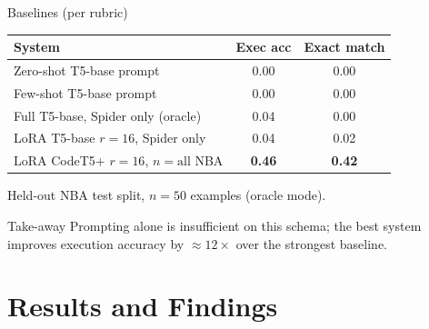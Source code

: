 \documentclass[aspectratio=169,11pt]{beamer}
\begin{document}
\begin{frame}{Baselines (per rubric)}
  \centering\small
  \begin{tabular}{lcc}
    \toprule
    \textbf{System} & \textbf{Exec acc} & \textbf{Exact match} \\
    \midrule
    Zero-shot T5-base prompt           & 0.00 & 0.00 \\
    Few-shot  T5-base prompt           & 0.00 & 0.00 \\
    Full T5-base, Spider only (oracle) & 0.04 & 0.00 \\
    LoRA T5-base $r{=}16$, Spider only & 0.04 & 0.02 \\
    \alert{LoRA CodeT5+ $r{=}16$, $n{=}\text{all}$ NBA} & \alert{\textbf{0.46}} & \alert{\textbf{0.42}} \\
    \bottomrule
  \end{tabular}

  \vspace{6pt}
  {\footnotesize Held-out NBA test split, $n = 50$ examples (oracle mode).}

  \begin{exampleblock}{Take-away}
    Prompting alone is insufficient on this schema; the best system improves
    execution accuracy by $\approx 12\times$ over the strongest baseline.
  \end{exampleblock}
\end{frame}

\section{Results and Findings}
\end{document}
